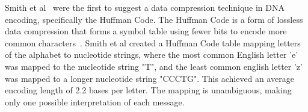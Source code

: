 \documentclass[USenglish,oneside,twocolumn]{article}
\begin{document}
Smith et al~\cite{SFHC2003BL} were the first to suggest a data compression technique in DNA encoding, specifically the Huffman Code. The Huffman Code is a form of lossless data compression that forms a symbol table using fewer bits to encode more common characters~\cite{H1952POTIRE}. Smith et al created a Huffman Code table mapping letters of the alphabet to nucleotide strings, where the most common English letter 'e' was mapped to the nucleotide string "T", and the least common english letter 'z' was mapped to a longer nucleotide string "CCCTG". This achieved an average encoding length of 2.2 bases per letter. The mapping is unambiguous, making only one possible interpretation of each message. 

\begin{table}[!t]
    \centering
    \caption{Comparative evaluation of encoding schemes}
    \label{tbl:related_work}
\end{table}
\end{document}
